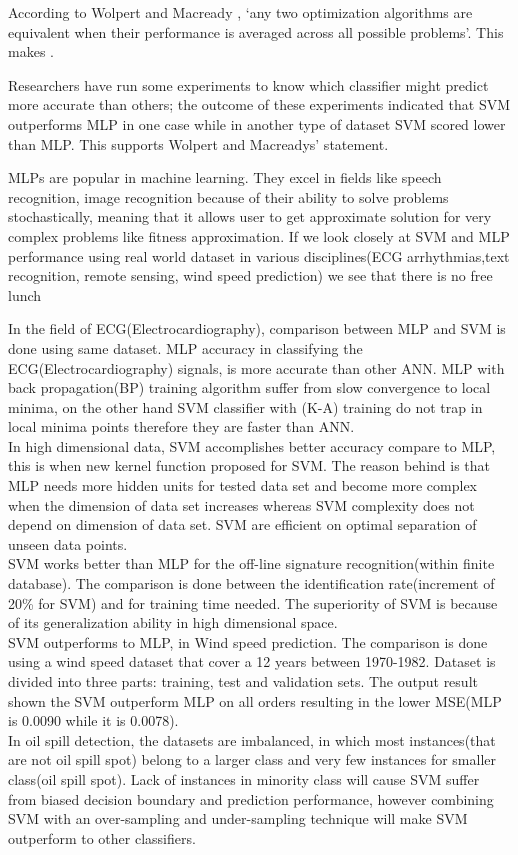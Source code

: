 According to Wolpert and Macready \cite{wolpert1995no}, `any two optimization algorithms are equivalent when their performance is averaged across all possible problems'. This makes .  

Researchers \cite{Moavenian20103088,Zanaty2012177} have run some experiments to know which classifier might predict more accurate than others; the outcome of these experiments indicated that SVM outperforms MLP in one case while in another type of dataset SVM scored lower than MLP. This supports Wolpert and Macreadys' statement. 

MLPs are popular in machine learning. They excel in fields like speech recognition, image recognition because of their ability to solve problems stochastically, meaning that it allows user to get approximate solution for very complex problems like fitness approximation\cite{jin2005neural}. If we look closely at SVM and MLP performance using real world dataset in various disciplines(ECG arrhythmias,text recognition, remote sensing, wind speed prediction) we see that there is no free lunch \cite{wolpert1995no}

In the field of ECG(Electrocardiography), comparison between MLP and SVM is done using same dataset. MLP accuracy in classifying the ECG(Electrocardiography) signals, is more accurate than other ANN. MLP with back propagation(BP) training algorithm suffer from slow convergence to local minima, on the other hand SVM classifier with (K-A) training do not trap in local minima points therefore they are faster than ANN\cite{Moavenian20103088}.\\
 In high dimensional data, SVM accomplishes better accuracy compare to MLP, this is when new kernel function proposed for SVM. The reason behind is that MLP needs more hidden units for tested data set and become more complex when the dimension of data set increases whereas SVM complexity does not depend on dimension of data set. SVM are efficient on optimal separation of unseen data points\cite{Zanaty2012177}.\\
SVM works better than MLP for the off-line signature recognition(within finite database). The comparison is done between the identification rate(increment of 20\% for SVM) and for training time needed. The superiority of SVM is because of its generalization ability in high dimensional space\cite{FriasMartinez2006693}.\\
SVM outperforms to MLP, in Wind speed prediction. The comparison is done using a wind speed dataset that cover a 12 years between 1970-1982. Dataset is divided into three parts: training, test and validation sets. The output result shown the SVM outperform MLP on all orders resulting in the lower MSE(MLP is 0.0090 while it is 0.0078)\cite{Mohandes2004939}.\\
In oil spill detection, the datasets are imbalanced, in which most instances(that are not oil spill spot) belong to a larger class and very few instances for smaller class(oil spill spot). Lack of instances in minority class will cause SVM suffer from biased decision boundary and prediction performance, however combining SVM with an over-sampling and under-sampling technique will make SVM outperform to other classifiers\cite{liu2006boosting}.

	
      




	